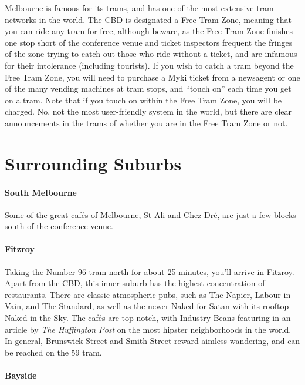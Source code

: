 Melbourne is famous for its trams, and has one of the most extensive
tram networks in the world. The CBD is designated a Free Tram Zone,
meaning that you can ride any tram for free, although beware, as the
Free Tram Zone finishes one stop short of the conference venue and 
ticket inspectors frequent the fringes of the zone trying to catch out
those who ride without a ticket, and are infamous for their intolerance
(including tourists). If you wish to catch a tram beyond the Free Tram
Zone, you will need to purchase a Myki ticket from a newsagent or one of
the many vending machines at tram stops, and ``touch on'' each time you
get on a tram. Note that if you touch on within the Free Tram Zone, you
will be charged. No, not the most user-friendly system in the world, but
there are clear announcements in the trams of whether you are in the
Free Tram Zone or not.

\section*{Surrounding Suburbs}
\vspace*{-1em}

\paragraph{South Melbourne}

Some of the great caf{\'e}s of Melbourne, St Ali and Chez Dr{\'e},
are just a few blocks south of the conference venue.

\paragraph{Fitzroy}

Taking the Number 96 tram north for about 25 minutes, you'll arrive in
Fitzroy.
Apart from the CBD, this inner suburb has the highest concentration of
restaurants.
There are classic atmospheric pubs, such as The Napier, Labour in
Vain, and The Standard, as well as the newer Naked for Satan with its 
rooftop
Naked in the Sky.
The caf{\'e}s are top notch, with Industry Beans
featuring in an article by {\em The Huffington Post} on the most hipster
neighborhoods in the world.
In general, Brunswick Street and Smith Street reward aimless wandering,
and can be reached on the 59 tram.

 

\paragraph{Bayside}

